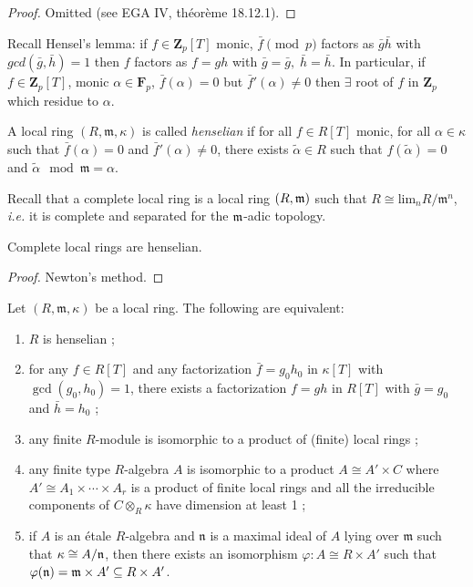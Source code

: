 \begin{proof}
Omitted (see EGA IV, th\'eor\`eme 18.12.1).
\end{proof}

\noindent
Recall Hensel's lemma: if $f\in \mathbf{Z}_p[T]$ monic, $\bar{f}\pmod{p}$
factors as  $\bar g\bar h$ with $gcd(\bar{g}, \bar{h})=1$ then $f$ factors
as $f = gh$ with  $\bar{g}=\bar{g}, \; \bar{h}=\bar{h}$. 
In particular, if $f \in \mathbf{Z}_p[T]$, monic
$\alpha\in \mathbf{F}_p$, $\bar f(\alpha) =0$  but $\bar f'(\alpha)\neq 0$
then $\exists $ root of $f$ in $\mathbf{Z}_p$ which  residue to $\alpha$. 


\begin{definition}
A local ring $(R, \mathfrak m, \kappa)$ is called {\it henselian} if for all 
$f\in R[T]$ monic, for all $\alpha\in \kappa$ such that $\bar f(\alpha)=0$ and 
$\bar f'(\alpha)\neq 0$, there exists $\tilde\alpha\in R$ such that 
$f(\tilde\alpha) = 0$ and $\tilde\alpha\mod\mathfrak m = \alpha$. 
\end{definition} 

\noindent
Recall that a complete local ring is a local ring $(R, \frak m)$ such that  
$R\cong \text{lim}_n R/\mathfrak m^n$, {\it i.e.} it is complete and separated 
for the $\frak m$-adic topology.

\begin{theorem}
Complete local rings are henselian.
\end{theorem}

\begin{proof}
Newton's method.
\end{proof}

\begin{theorem} \label{thm:eqDefHenselian}
Let $(R, \mathfrak m, \kappa)$ be a local ring. The following are equivalent:
\begin{enumerate}
\item $R$ is henselian ;
\item for any $f\in R[T]$ and any factorization $\bar f = g_0 h_0$ in 
$\kappa[T]$ with $\gcd(g_0,h_0)=1$, there exists a factorization $f=gh$ in 
$R[T]$ with $\bar g = g_0$ and $\bar h=h_0$ ;
\item any finite $R$-module is isomorphic to a product of (finite) local rings ;
\item any finite type $R$-algebra $A$ is isomorphic to a product $A \cong A' 
\times C$ where $A' \cong A_1 \times \cdots \times A_r$ is a product of finite 
local rings and all the irreducible components of $C\otimes_R\kappa$ have 
dimension at least 1 ;
\item if $A$ is an \'etale $R$-algebra and $\mathfrak n$ is a maximal ideal of 
$A$ lying over $\mathfrak m$ such that $\kappa \cong A/\frak n$, then there 
exists an isomorphism $\varphi: A \cong R\times A'$ such that $\varphi(\frak n) 
= \frak m \times A'\subseteq R\times A'$.
\end{enumerate}
\end{theorem}

